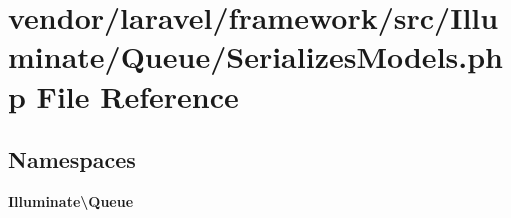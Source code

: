 \section{vendor/laravel/framework/src/\+Illuminate/\+Queue/\+Serializes\+Models.php File Reference}
\label{_serializes_models_8php}
\subsection*{Namespaces}
\begin{DoxyCompactItemize}
\item 
 {\bf Illuminate\textbackslash{}\+Queue}
\end{DoxyCompactItemize}
